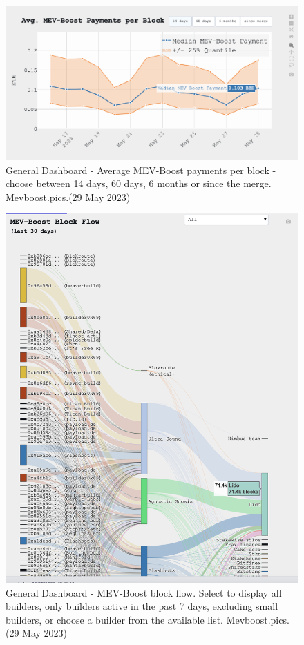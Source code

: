 \documentclass[UTF8]{article}
\begin{document}
{\begin{figure}[htbp]
\begin{center}
\includegraphics[width=0.9\linewidth]{images/mevhome3}
\caption{General Dashboard -  Average MEV-Boost payments per block - choose between 14 days, 60 days, 6 months or since the merge. Mevboost.pics.(29 May 2023)}
\label{fig:mevhome3}
\end{center}
\end{figure}

\begin{figure}[htbp]
\begin{center}
\includegraphics[width=0.9\linewidth]{images/mevhome4}
\caption{General Dashboard - MEV-Boost block flow. Select to display all builders, only builders active in the past 7 days, excluding small builders, or choose  a builder from the available list. Mevboost.pics.(29 May 2023)}
\label{fig:mevhome4}
\end{center}
\end{figure}
\clearpage

}
\end{document}
